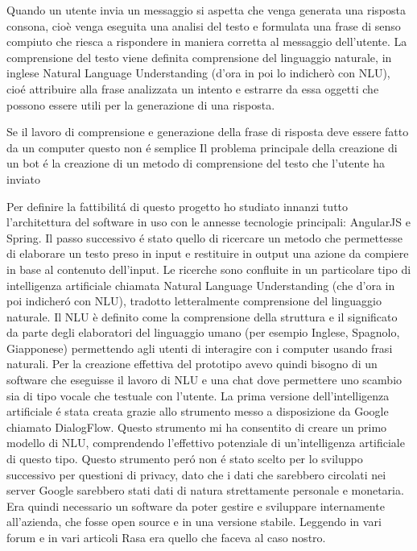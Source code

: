 Quando un utente invia un messaggio si aspetta che venga generata una risposta consona, cioè venga eseguita una analisi del testo e formulata una frase di senso compiuto che riesca a rispondere in maniera corretta al messaggio dell'utente. La comprensione del testo viene definita comprensione del linguaggio naturale, in inglese Natural Language Understanding (d'ora in poi lo indicherò con NLU), cio\'e attribuire alla frase analizzata un intento e estrarre da essa oggetti che possono essere utili per la generazione di una risposta.

Se il lavoro di comprensione e generazione della frase di risposta deve essere fatto da un computer questo non \'e semplice
Il problema principale della creazione di un bot \'e la creazione di un metodo di comprensione del testo che l'utente ha inviato



Per definire la fattibilit\'{a} di questo progetto ho studiato innanzi tutto l'architettura del software in uso con le annesse tecnologie principali: AngularJS e Spring.
Il passo successivo \'{e} stato quello di ricercare un metodo che permettesse di elaborare un testo preso in input e restituire in output una azione da compiere in base al contenuto dell'input. Le ricerche sono confluite in un particolare tipo di intelligenza artificiale chiamata Natural Language Understanding (che d'ora in poi indicher\'{o} con NLU), tradotto letteralmente comprensione del linguaggio naturale. 
Il NLU \`{e} definito come la comprensione della struttura e il significato da parte degli elaboratori del linguaggio umano (per esempio Inglese, Spagnolo, Giapponese) permettendo agli utenti di interagire con i computer usando frasi naturali.
Per la creazione effettiva del prototipo avevo quindi bisogno di un software che eseguisse il lavoro di NLU e una chat dove permettere uno scambio sia di tipo vocale che testuale con l'utente.
La prima versione dell'intelligenza artificiale \'e stata creata grazie allo strumento messo a disposizione da Google chiamato DialogFlow. Questo strumento mi ha consentito di creare un primo modello di NLU, comprendendo l'effettivo potenziale di un'intelligenza artificiale di questo tipo. 
Questo strumento per\'o non \'e stato scelto per lo sviluppo successivo per questioni di privacy, dato che i dati che sarebbero circolati nei server Google sarebbero stati dati di natura strettamente personale e monetaria.
Era quindi necessario un software da poter gestire e sviluppare internamente all'azienda, che fosse open source e in una versione stabile. Leggendo in vari forum e in vari articoli Rasa era quello che faceva al caso nostro.






